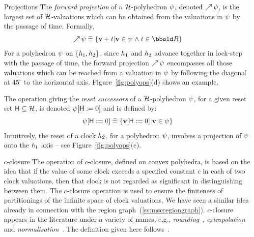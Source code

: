 {\begin{paragraph}{Projections} The \emph{forward projection} of a 
$\clocks$-polyhedron ${\psi}$, denoted $\mathop{\nearrow}{{\psi}}$, is
the largest set of $\clocks$-valuations which can be obtained from the
valuations in ${\psi}$ by the passage of time. Formally,
\[ \forwardproj{\clkcond} \defs \{\clkvl + t | \clkvl \in \clkcond \land 
   t \in \Time\} \] 
For a polyhedron ${\psi}$ on
$\{h_1,h_2\}$, since $h_1$ and $h_2$ advance
together in lock-step with the passage of time, the forward projection
$\mathop{\nearrow}{{\psi}}$ encompasses all those valuations which can be
reached from a valuation in ${\psi}$ by following the diagonal at
$45^\circ$ to the horizontal axis. Figure~\ref{fig:polyops}(d) shows
an example.

The operation giving the \emph{reset successors} of a
$\clocks$-polyhedron ${\psi}$, for a given reset set $\someclks
\subseteq \clocks$, is denoted ${\psi}[{\sf H} := 0]$ and is
defined by:
\[ {\psi}[{\sf H} := 0] \mathrel{\widehat=} \{\mathbf{v}[{\sf H} := 0] | \mathbf{v} \in {\psi}\} \]
Intuitively, the reset of a clock $h_2$, for a polyhedron
${\psi}$, involves a projection of ${\psi}$ onto the $h_1$ axis -- see
Figure~\ref{fig:polyops}(e).
\end{paragraph}

\begin{paragraph}{$c$-closure}
The operation of $c$-closure, defined on convex polyhedra, is based on
the idea that if the value of some clock exceeds a specified constant
$c$ in each of two clock valuations, then that clock is not regarded
as significant in distinguishing between them. The $c$-closure
operation is used to ensure the finiteness of partitionings of the
infinite space of clock valuations. We have seen a similar idea
already in connection with the region
graph~(\Sec\ref{ss:mscregiongraph}). $c$-closure appears in the literature
under a variety of names, e.g., \emph{rounding}~\cite{wt:95},
\emph{extrapolation}~\cite{dt:98} and \emph{normalisation}~\cite{pet:99}. 
The definition given here follows~\cite{tri:98}.


\end{paragraph}}
